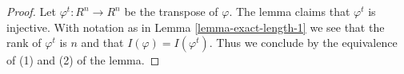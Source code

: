 \documentclass[10pt,a4paper]{amsart}
\theoremstyle{plain}
\theoremstyle{definition}
\theoremstyle{remark}
\numberwithin{equation}{subsection}
\begin{document}
\begin{proof}
Let $\varphi^t : R^n \to R^n$ be the transpose of $\varphi$.
The lemma claims that $\varphi^t$ is injective.
With notation as in Lemma \ref{lemma-exact-length-1}
we see that the rank of $\varphi^t$ is $n$ and that
$I(\varphi) = I(\varphi^t)$. Thus we conclude by
the equivalence of (1) and (2) of the lemma.
\end{proof}
\end{document}
